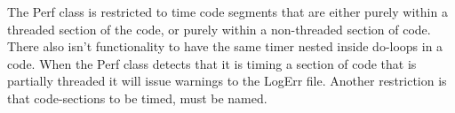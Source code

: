 %



The Perf class is restricted to time code segments that are either
purely within a threaded section of the code, or purely within a
non-threaded section of code. There also isn't functionality to
have the same timer nested inside do-loops in a code. When the Perf
class detects that it is timing a section of code that is partially
threaded it will issue warnings to the LogErr file. Another restriction
is that code-sections to be timed, must be named.
